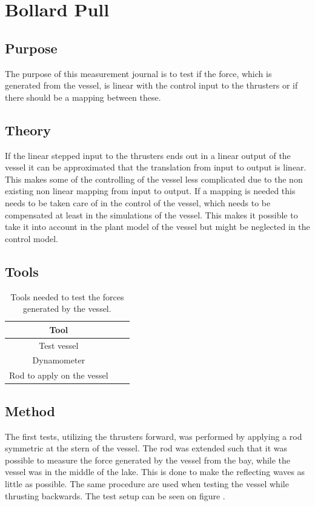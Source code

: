 \chapter{Bollard Pull}
\label{app:bollpull}

\section{Purpose}
The purpose of this measurement journal is to test if the force, which is generated from the vessel, is linear with the control input to the thrusters or if there should be a mapping between these.

\section{Theory}
If the linear stepped input to the thrusters ends out in a linear output of the vessel it can be approximated that the translation from input to output is linear. This makes some of the controlling of the vessel less complicated due to the non existing non linear mapping from input to output. If a mapping is needed this needs to be taken care of in the control of the vessel, which needs to be compensated at least in the simulations of the vessel. This makes it possible to take it into account in the plant model of the vessel but might be neglected in the control model.

\section{Tools}
\begin{table}[htbp]
\centering
\begin{tabular}{ccc}
	\toprule
  Tool \\
  \midrule
  Test vessel \\
  Dynamometer \\
  Rod to apply on the vessel \\
  	\bottomrule
\end{tabular}
\caption{Tools needed to test the forces generated by the vessel.}
\label{tab:bollpulltool}
\end{table}

\section{Method}
The first tests, utilizing the thrusters forward, was performed by applying a rod symmetric at the stern of the vessel. The rod was extended such that it was possible to measure the force generated by the vessel from the bay, while the vessel was in the middle of the lake. This is done to make the reflecting waves as little as possible. The same procedure are used when testing the vessel while thrusting backwards. The test setup can be seen on figure .


